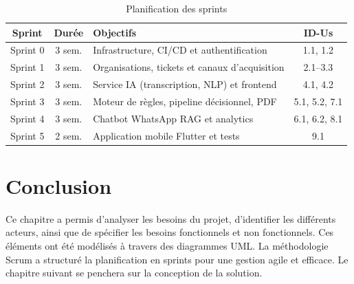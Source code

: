 \begin{table}[H]
\centering
\caption{Planification des sprints}
\label{tab:sprints}
\small
\begin{tabular}{|c|c|p{7cm}|c|}
\hline
\textbf{Sprint} & \textbf{Dur\'{e}e} & \textbf{Objectifs} & \textbf{ID-Us} \\
\hline
Sprint 0 & 3 sem. & Infrastructure, CI/CD et authentification & 1.1, 1.2 \\
\hline
Sprint 1 & 3 sem. & Organisations, tickets et canaux d'acquisition & 2.1--3.3 \\
\hline
Sprint 2 & 3 sem. & Service IA (transcription, NLP) et frontend & 4.1, 4.2 \\
\hline
Sprint 3 & 3 sem. & Moteur de r\`{e}gles, pipeline d\'{e}cisionnel, PDF & 5.1, 5.2, 7.1 \\
\hline
Sprint 4 & 3 sem. & Chatbot WhatsApp RAG et analytics & 6.1, 6.2, 8.1 \\
\hline
Sprint 5 & 2 sem. & Application mobile Flutter et tests & 9.1 \\
\hline
\end{tabular}
\end{table}

\section*{Conclusion}
\label{sec:conclusion}

Ce chapitre a permis d'analyser les besoins du projet, d'identifier les diff\'{e}rents acteurs, ainsi que de sp\'{e}cifier les besoins fonctionnels et non fonctionnels. Ces \'{e}l\'{e}ments ont \'{e}t\'{e} mod\'{e}lis\'{e}s \`{a} travers des diagrammes UML. La m\'{e}thodologie Scrum a structur\'{e} la planification en sprints pour une gestion agile et efficace. Le chapitre suivant se penchera sur la conception de la solution.

